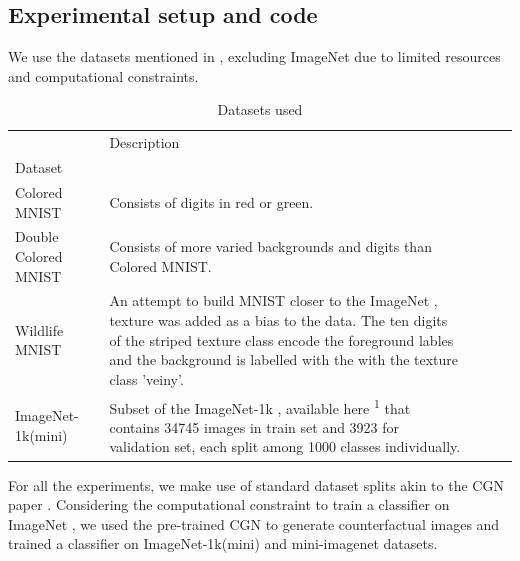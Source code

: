 \subsection{Experimental setup and code}
We use the datasets mentioned in \cite{sauer2021counterfactual}, excluding ImageNet \cite{deng2009imagenet} due to limited resources and computational constraints.


\begin{table}[h]
\centering

\begin{tabularx}{\textwidth}{lXXXX}
\toprule
{} & Description\\
Dataset&\\
\midrule
Colored MNIST & Consists of digits in red or green.  \\ 
Double Colored MNIST & Consists of more varied backgrounds and digits than Colored MNIST.  \\
Wildlife MNIST & An attempt to build MNIST \cite{lecun1998gradient} closer to the ImageNet \cite{deng2009imagenet}, texture was added as a bias to the data. The ten digits of the striped texture class encode the foreground lables and the background is labelled with the with the texture class 'veiny'.  \\
ImageNet-1k(mini) & Subset of the ImageNet-1k \cite{Imagenet-1k}, available here \textsuperscript{1} that contains 34745 images in train set and 3923 for validation set, each split among 1000 classes individually.
\label{table:imagenet_ood}
\end{tabularx}
\caption{Datasets used}
\end{table}
For all the experiments, we make use of standard dataset splits akin to the CGN paper \cite{sauer2021counterfactual}. Considering the computational constraint to train a classifier on ImageNet \cite{imagenet}, we used the pre-trained CGN to generate counterfactual images and trained a classifier on ImageNet-1k(mini) and mini-imagenet datasets.


